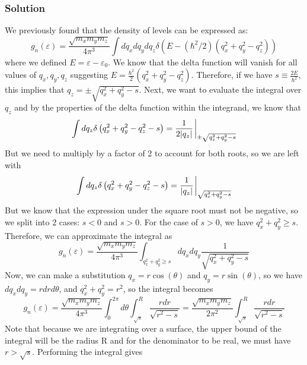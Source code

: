 \documentclass[12pt]{article}
\begin{document}
\subsubsection{Solution}
We previously found that the density of levels can be expressed as:
\begin{equation}
    g_n(\varepsilon) = \frac{\sqrt{m_x m_y m_z}}{4 \pi^3}\int dq_x dq_y dq_z \delta\left(E-\left(\hbar^2 / 2\right)\left(q_x^2 + q_y^2 - q_z^2\right)\right)
\end{equation}
where we defined $E = \varepsilon - \varepsilon_0$. We know that the delta function will vanish for all values of $q_x, q_y, q_z$ suggesting $E=\frac{\hbar^{2}}{2} \left(q_x^2 + q_y^2 - q_z^2\right)$. Therefore, if we have $s\equiv \frac{2E}{\hbar^{2}}$, this implies that $q_z = \pm \sqrt{q_x^2 + q_y^2 - s}$. Next, we want to evaluate the integral over $q_z$ and by the properties of the delta function within the integrand, we know that
\begin{equation}
    \int dq_z \delta\left(q_x^2 + q_y^2 - q_z^2 -s \right) = \frac{1}{2|q_z|} \eval_{\pm \sqrt{q_x^2 + q_y^2 - s}}
\end{equation}
But we need to multiply by a factor of 2 to account for both roots, so we are left with
\begin{equation}
    \int dq_z \delta\left(q_x^2 + q_y^2 - q_z^2 -s \right) = \frac{1}{|q_z|} \eval_{\sqrt{q_x^2 + q_y^2 - s}}
\end{equation}
But we know that the expression under the square root must not be negative, so we split into 2 cases: $s < 0$ and $s > 0$. For the case of $s > 0$, we have $q_x^2 + q_y^2 \geq s$. Therefore, we can approximate the integral as
\begin{equation}
    g_n(\varepsilon) = \frac{\sqrt{m_x m_y m_z}}{4 \pi^3}\int_{q_x^2 + q_y^2 \geq s} dq_x dq_y \frac{1}{\sqrt{q_x^2 + q_y^2 - s}}
\end{equation}
Now, we can make a substitution $q_x = r\cos(\theta)$ and $q_y = r\sin(\theta)$, so we have $dq_x dq_y = r dr d\theta$, and $q_x^2 + q_y^2 = r^2$, so the integral becomes
\begin{equation}
    g_n(\varepsilon) = \frac{\sqrt{m_x m_y m_z}}{4 \pi^3}\int_{0}^{2\pi} d\theta \int_{\sqrt{s}}^{R} \frac{r dr}{\sqrt{r^2 - s}} = \frac{\sqrt{m_x m_y m_z}}{2 \pi^2}\int_{\sqrt{s}}^{R} \frac{rdr}{\sqrt{r^2 - s}}
\end{equation}
Note that because we are integrating over a surface, the upper bound of the integral will be the radius R and for the denominator to be real, we must have $r > \sqrt{s}$. Performing the integral gives
\end{document}

